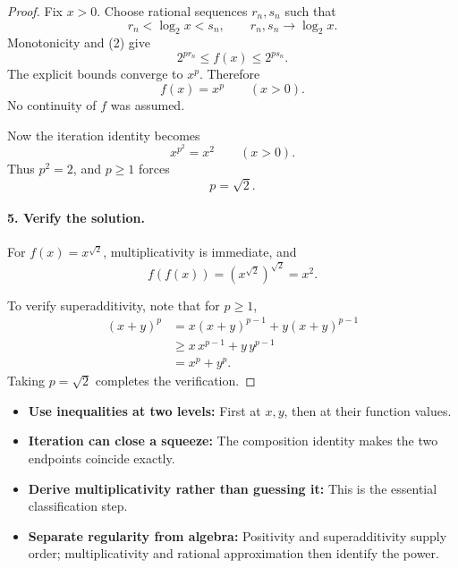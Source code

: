 \begin{dlsummary}[title={\bfseries Solution 66. The Irrational Iteration Root},breakable]
\begin{proof}
Fix \(x>0\). Choose rational sequences \(r_n,s_n\) such that
\[
r_n<\log_2x<s_n,
\qquad r_n,s_n\longrightarrow\log_2x.
\]
Monotonicity and (2) give
\[
2^{pr_n}\le f(x)\le2^{ps_n}.
\]
The explicit bounds converge to \(x^p\). Therefore
\[
\boxed{f(x)=x^p\qquad(x>0).} \tag{3}
\]
No continuity of \(f\) was assumed.

Now the iteration identity becomes
\[
x^{p^2}=x^2\qquad(x>0).
\]
Thus \(p^2=2\), and \(p\ge1\) forces
\[
p=\sqrt2.
\]

\paragraph{5. Verify the solution.}

For \(f(x)=x^{\sqrt2}\), multiplicativity is immediate, and
\[
f(f(x))=(x^{\sqrt2})^{\sqrt2}=x^2.
\]

To verify superadditivity, note that for \(p\ge1\),
\[
\begin{aligned}
(x+y)^p
&=x(x+y)^{p-1}+y(x+y)^{p-1}\\
&\ge x\,x^{p-1}+y\,y^{p-1}\\
&=x^p+y^p.
\end{aligned}
\]
Taking \(p=\sqrt2\) completes the verification.
\end{proof}
\end{dlsummary}

\begin{takeaways}
\begin{itemize}
\item \textbf{Use inequalities at two levels:} First at \(x,y\), then at their function values.
\item \textbf{Iteration can close a squeeze:} The composition identity makes the two endpoints coincide exactly.
\item \textbf{Derive multiplicativity rather than guessing it:} This is the essential classification step.
\item \textbf{Separate regularity from algebra:} Positivity and superadditivity supply order; multiplicativity and rational approximation then identify the power.
\end{itemize}
\end{takeaways}
